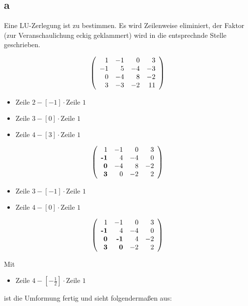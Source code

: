 \documentclass[12pt]{article}
\begin{document}
\subsection*{a}
Eine LU-Zerlegung ist zu bestimmen. Es wird Zeilenweise eliminiert, der
Faktor (zur Veranschaulichung eckig geklammert) wird in die entsprechnde Stelle geschrieben.

$$
\left(
	\begin{array}{r r r r}
		 1	 	&	 -1		&	  0		&	 3	\\
		-1		&	  5		&	 -4		&	-3	\\
		 0	 	&	 -4		&	  8		&	-2	\\
		 3	 	&	 -3		&	 -2		&	11	\\
	\end{array}
\right )
$$

\begin{itemize}
\item $\text{Zeile }2- [-1] \cdot \text{Zeile }1$
\item $\text{Zeile }3- [0] \cdot \text{Zeile }1$
\item $\text{Zeile }4- [3] \cdot \text{Zeile }1$
\end{itemize}

$$
\left(
	\begin{array}{r r r r}
		 1	 	&	 -1		&	  0		&	 3	\\
		\textbf{-1}		&	  4		&	 -4		&	 0	\\
		 \textbf{0}	 	&	 -4		&	  8		&	-2	\\
		 \textbf{3}	 	&	  0		&	 -2		&	 2	\\
	\end{array}
\right )
$$

\begin{itemize}
\item $\text{Zeile }3- [-1] \cdot \text{Zeile }1$
\item $\text{Zeile }4- [0] \cdot \text{Zeile }1$
\end{itemize}

$$
\left(
	\begin{array}{r r r r}
		 1	 	&	 -1		&	  0		&	 3	\\
		\textbf{-1}		&	  4		&	 -4		&	 0	\\
		 \textbf{0}	 	&	 \textbf{-1}		&	  4		&	-2	\\
		 \textbf{3}	 	&	 \textbf{0}		&	 -2		&	 2	\\
	\end{array}
\right )
$$

Mit
\begin{itemize}
\item $\text{Zeile }4- [ - \frac{1}{2} ] \cdot \text{Zeile }1$
\end{itemize}
ist die Umformung fertig und sieht folgendermaßen aus:
\end{document}
